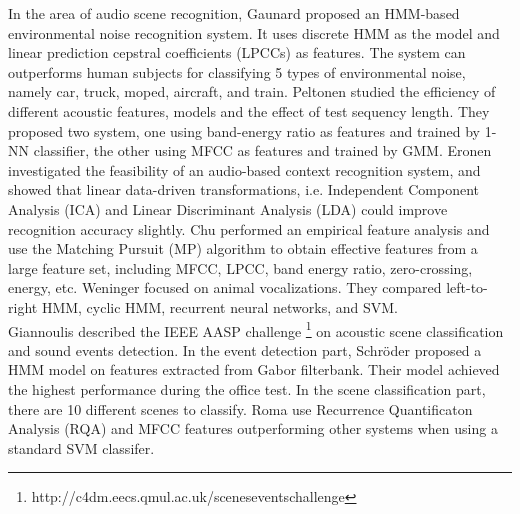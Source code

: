 In the area of audio scene recognition, Gaunard \parencite{gaunard1998automatic} proposed an HMM-based environmental noise recognition system. 
It uses discrete HMM as the model and linear prediction cepstral coefficients (LPCCs) as features. 
The system can outperforms human subjects for classifying 5 types of environmental noise, namely car, truck, moped, aircraft, and train. 
Peltonen \parencite{peltonen2001computational} studied the efficiency of different acoustic features, models and the effect of test sequency length. 
They proposed two system, one using band-energy ratio as features and trained by 1-NN classifier, the other using MFCC as features and trained by GMM. 
Eronen  \parencite{eronen2006audio-based} investigated the feasibility of an audio-based context recognition system, and showed that linear data-driven transformations, i.e. Independent   Component Analysis (ICA) and Linear Discriminant Analysis (LDA) could improve recognition accuracy slightly. 
Chu \parencite{chu2009environmental} performed an empirical feature analysis and use the Matching Pursuit (MP) algorithm to obtain effective features from a large feature set, including MFCC, LPCC, band energy ratio, zero-crossing, energy, etc. 
Weninger \parencite{weninger2011audio} focused on animal vocalizations. They compared left-to-right HMM, cyclic HMM, recurrent neural networks, and SVM. \\

Giannoulis \parencite{giannoulis2013applications} described the IEEE AASP challenge \footnote{http://c4dm.eecs.qmul.ac.uk/sceneseventschallenge} on acoustic scene classification and sound events detection.  
In the event detection part, Schr\"{o}der \parencite{schroder2013acoustic} proposed a HMM model on features extracted from Gabor filterbank. 
Their model achieved the highest performance during the office test.   
In the scene classification part, there are 10 different scenes to classify. 
Roma \parencite{romarecurrence} use Recurrence Quantificaton Analysis (RQA) and MFCC features outperforming other systems when using a standard SVM classifer. 

